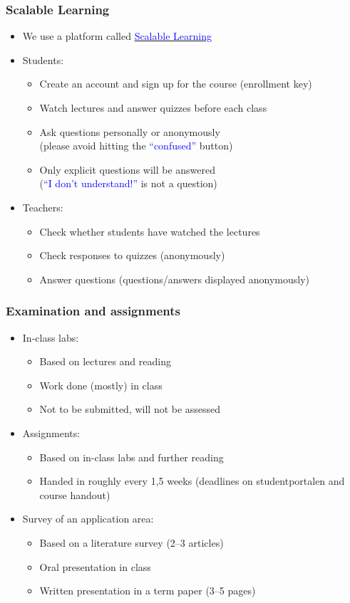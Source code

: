 \documentclass[dvipsnames]{beamer}
\begin{document}
\begin{frame}
\frametitle{Scalable Learning}
\begin{itemize}
\item We use a platform called \href{http://www.scalable-learning.com/\#/users/login}{\textcolor{blue}{Scalable Learning}}
\item Students:
\begin{itemize}
\item Create an account and sign up for the course (\alert{enrollment key})
\item Watch lectures and answer quizzes before each class
\item Ask questions personally or anonymously \\(please avoid hitting
  the \textcolor{blue}{``confused''} button)
\item Only explicit questions will be answered
  \\(\textcolor{blue}{``I don't understand!''} is not a
  question)
\end{itemize}
\item Teachers:
\begin{itemize}
\item Check whether students have watched the lectures
\item Check responses to quizzes (anonymously)
\item Answer questions (questions/answers displayed anonymously)
\end{itemize}
\end{itemize}
\end{frame}

\begin{frame}
\frametitle{Examination and assignments}
\begin{itemize}
\item In-class labs:
  \begin{itemize}
  \item Based on lectures and reading
  \item Work done (mostly) in class
  \item Not to be submitted, will not be assessed
  \end{itemize}
\item<2-> Assignments:
  \begin{itemize}
  \item Based on in-class labs and further reading
  \item Handed in roughly every 1,5 weeks (deadlines on studentportalen and course handout)
  \end{itemize}
\item<3-> Survey of an application area:
  \begin{itemize}
  \item Based on a literature survey (2--3 articles)
  \item Oral presentation in class
  \item Written presentation in a term paper (3--5 pages)
  \end{itemize}
\end{itemize}
\end{frame}
\end{document}
